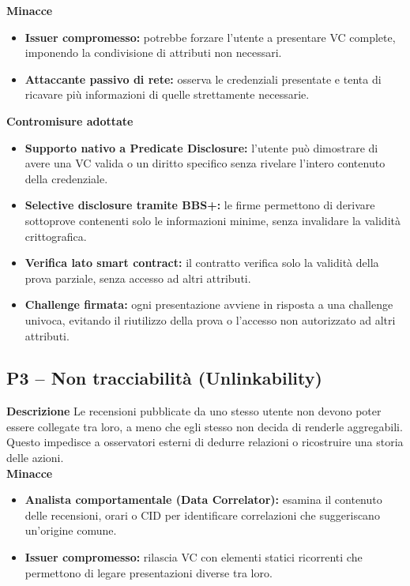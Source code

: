             \noindent \textbf{Minacce}
                \begin{itemize}
                    \item \textbf{Issuer compromesso:} potrebbe forzare l'utente a presentare VC complete, imponendo la condivisione di attributi non necessari.

                    \item \textbf{Attaccante passivo di rete:} osserva le credenziali presentate e tenta di ricavare più informazioni di quelle strettamente necessarie.
                \end{itemize}

            \noindent \textbf{Contromisure adottate}
                \begin{itemize}
                    \item \textbf{Supporto nativo a Predicate Disclosure:} l'utente può dimostrare di avere una VC valida o un diritto specifico senza rivelare l'intero contenuto della credenziale.

                    \item \textbf{Selective disclosure tramite BBS+:} le firme permettono di derivare sottoprove contenenti solo le informazioni minime, senza invalidare la validità crittografica.

                    \item \textbf{Verifica lato smart contract:} il contratto verifica solo la validità della prova parziale, senza accesso ad altri attributi.

                    \item \textbf{Challenge firmata:} ogni presentazione avviene in risposta a una challenge univoca, evitando il riutilizzo della prova o l'accesso non autorizzato ad altri attributi.
                \end{itemize}

        \subsection{P3 – Non tracciabilità (Unlinkability)}
            \noindent \textbf{Descrizione}
                Le recensioni pubblicate da uno stesso utente non devono poter essere collegate tra loro, a meno che egli stesso non decida di renderle aggregabili. Questo impedisce a osservatori esterni di dedurre relazioni o ricostruire una storia delle azioni. \\

            \noindent \textbf{Minacce}
                \begin{itemize}
                    \item \textbf{Analista comportamentale (Data Correlator):} esamina il contenuto delle recensioni, orari o CID per identificare correlazioni che suggeriscano un'origine comune.

                    \item \textbf{Issuer compromesso:} rilascia VC con elementi statici ricorrenti che permettono di legare presentazioni diverse tra loro.
                \end{itemize}

